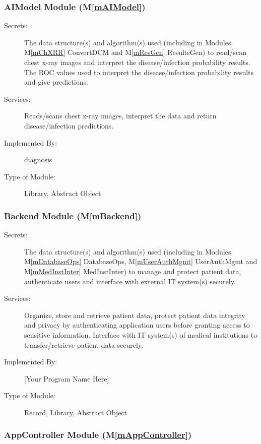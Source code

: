 \documentclass[12pt, titlepage]{article}
\newcommand{\mref}[1]{M\ref{#1}}
\begin{document}
\subsubsection{AIModel Module (\mref{mAIModel})}

\begin{description}
\item[Secrets:] The data structure(s) and algorithm(s) used (including in
  Modules \mref{mChXRR} ConvertDCM and \mref{mResGen} ResultsGen) to
  read/scan chest x-ray images and interpret the disease/infection probability
  results. The ROC values used to interpret the disease/infection probability
  results and give predictions.
\item[Services:] Reads/scans chest x-ray images, interpret the data and return
  disease/infection predictions.
\item[Implemented By:] diagnosis
\item[Type of Module:] Library, Abstract Object
\end{description}



\subsubsection{Backend Module (\mref{mBackend})}

\begin{description}
\item[Secrets:] The data structure(s) and algorithm(s) used (including in
  Modules \mref{mDatabaseOps} DatabaseOps, \mref{mUserAuthMgmt} UserAuthMgmt
  and \mref{mMedInstInter} MedInstInter) to manage and protect patient data,
  authenticate users and interface with external IT system(s) securely.
\item[Services:] Organize, store and retrieve patient data, protect patient
  data integrity and privacy by authenticating application users before
  granting access to sensitive information. Interface with IT system(s) of
  medical institutions to transfer/retrieve patient data securely.
\item[Implemented By:] [Your Program Name Here]
\item[Type of Module:] Record, Library, Abstract Object
\end{description}

\subsubsection{AppController Module (\mref{mAppController})}
\end{document}
